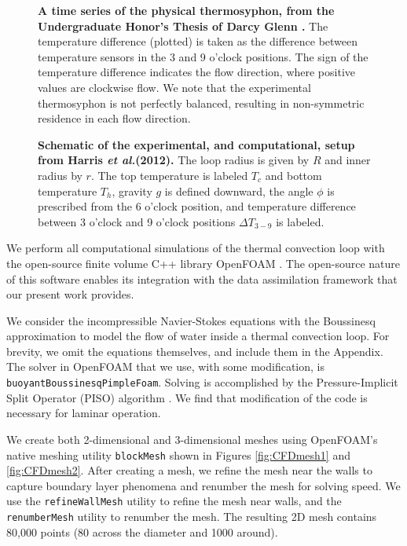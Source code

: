 \documentclass[10pt,letterpaper]{article}
\newcommand{\etal}{\textit{et al.}}
\begin{document}
\begin{figure}[h]
  \centering
  \caption[A time series of the physical thermosyphon, from the Undergraduate Honor's Thesis of Darcy Glenn {\protect \cite{glenn2013}}]{
\textbf{    A time series of the physical thermosyphon, from the Undergraduate Honor's Thesis of Darcy Glenn {\protect \cite{glenn2013}}.
}    The temperature difference (plotted) is taken as the difference between temperature sensors in the 3 and 9 o'clock positions.
     The sign of the temperature difference indicates the flow direction, where positive values are clockwise flow.
     We note that the experimental thermosyphon is not perfectly balanced, resulting in non-symmetric residence in each flow direction.
      }
  \label{fig:thermosyphon-physical-timeseries}
\end{figure}

\begin{figure}[h]
  \centering
  \caption[Schematic of the experimental, and computational, setup from Harris \etal (2012)]{
\textbf{    Schematic of the experimental, and computational, setup from Harris \etal (2012).
}    The loop radius is given by $R$ and inner radius by $r$.
    The top temperature is labeled $T_c$ and bottom temperature $T_h$, gravity $g$ is defined downward, the angle $\phi$ is prescribed from the 6 o'clock position, and temperature difference between 3 o'clock and 9 o'clock positions $\Delta T_{3-9}$ is labeled.
  }
  \label{fig:thermosyphon-schematic}
\end{figure}

We perform all computational simulations of the thermal convection loop with the open-source finite volume C++ library OpenFOAM \cite{jasak2007}.
The open-source nature of this software enables its integration with the data assimilation framework that our present work provides.

We consider the incompressible Navier-Stokes equations with the Boussinesq approximation to model the flow of water inside a thermal convection loop.
For brevity, we omit the equations themselves, and include them in the Appendix.
The solver in OpenFOAM that we use, with some modification, is \verb|buoyantBoussinesqPimpleFoam|.
Solving is accomplished by the Pressure-Implicit Split Operator (PISO) algorithm \cite{issa1986solution}.
We find that modification of the code is necessary for laminar operation.

We create both 2-dimensional and 3-dimensional meshes using OpenFOAM's native meshing utility \verb|blockMesh| shown in Figures \ref{fig:CFDmesh1} and \ref{fig:CFDmesh2}.
After creating a mesh, we refine the mesh near the walls to capture boundary layer phenomena and renumber the mesh for solving speed.
We use the \verb|refineWallMesh| utility to refine the mesh near walls, and the \verb|renumberMesh| utility to renumber the mesh.
The resulting 2D mesh contains 80,000 points (80 across the diameter and 1000 around).
\end{document}
